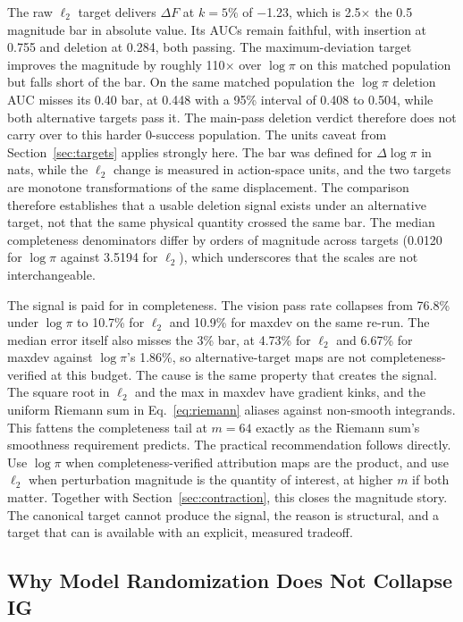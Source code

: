 \documentclass{article}
\begin{document}
The raw $\ell_2$ target delivers $\Delta F$ at $k{=}5\%$ of $-$1.23, which is 2.5$\times$ the 0.5 magnitude bar in absolute value.
Its AUCs remain faithful, with insertion at 0.755 and deletion at 0.284, both passing.
The maximum-deviation target improves the magnitude by roughly 110$\times$ over $\log\pi$ on this matched population but falls short of the bar.
On the same matched population the $\log\pi$ deletion AUC misses its 0.40 bar, at 0.448 with a 95\% interval of 0.408 to 0.504, while both alternative targets pass it.
The main-pass deletion verdict therefore does not carry over to this harder 0-success population.
The units caveat from Section~\ref{sec:targets} applies strongly here.
The bar was defined for $\Delta\log\pi$ in nats, while the $\ell_2$ change is measured in action-space units, and the two targets are monotone transformations of the same displacement.
The comparison therefore establishes that a usable deletion signal exists under an alternative target, not that the same physical quantity crossed the same bar.
The median completeness denominators differ by orders of magnitude across targets (0.0120 for $\log\pi$ against 3.5194 for $\ell_2$), which underscores that the scales are not interchangeable.

The signal is paid for in completeness.
The vision pass rate collapses from 76.8\% under $\log\pi$ to 10.7\% for $\ell_2$ and 10.9\% for maxdev on the same re-run.
The median error itself also misses the 3\% bar, at 4.73\% for $\ell_2$ and 6.67\% for maxdev against $\log\pi$'s 1.86\%, so alternative-target maps are not completeness-verified at this budget.
The cause is the same property that creates the signal.
The square root in $\ell_2$ and the max in maxdev have gradient kinks, and the uniform Riemann sum in Eq.~\ref{eq:riemann} aliases against non-smooth integrands.
This fattens the completeness tail at $m{=}64$ exactly as the Riemann sum's smoothness requirement predicts.
The practical recommendation follows directly.
Use $\log\pi$ when completeness-verified attribution maps are the product, and use $\ell_2$ when perturbation magnitude is the quantity of interest, at higher $m$ if both matter.
Together with Section~\ref{sec:contraction}, this closes the magnitude story.
The canonical target cannot produce the signal, the reason is structural, and a target that can is available with an explicit, measured tradeoff.

\subsection{Why Model Randomization Does Not Collapse IG}
\label{sec:anchoring}
\end{document}
